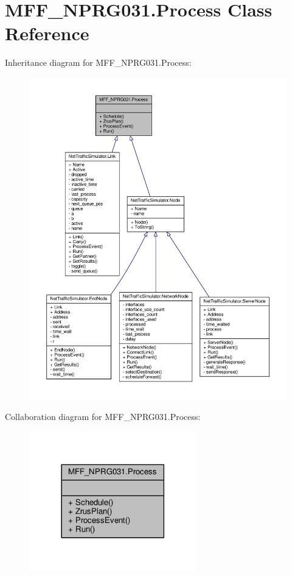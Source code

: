 \hypertarget{classMFF__NPRG031_1_1Process}{\section{M\-F\-F\-\_\-\-N\-P\-R\-G031.\-Process Class Reference}
\label{classMFF__NPRG031_1_1Process}
}


Inheritance diagram for M\-F\-F\-\_\-\-N\-P\-R\-G031.\-Process\-:
\nopagebreak
\begin{figure}[H]
\begin{center}
\leavevmode
\includegraphics[width=350pt]{classMFF__NPRG031_1_1Process__inherit__graph}
\end{center}
\end{figure}


Collaboration diagram for M\-F\-F\-\_\-\-N\-P\-R\-G031.\-Process\-:\nopagebreak
\begin{figure}[H]
\begin{center}
\leavevmode
\includegraphics[width=206pt]{classMFF__NPRG031_1_1Process__coll__graph}
\end{center}
\end{figure}
